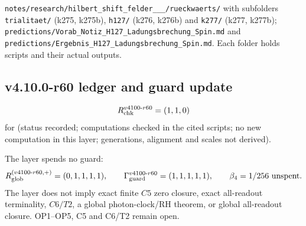 {\raggedright
\texttt{notes/\allowbreak research/\allowbreak hilbert\_\allowbreak shift\_\allowbreak felder\_\_\_/\allowbreak rueckwaerts/} with subfolders
\texttt{trialitaet/} (k275, k275b), \texttt{h127/} (k276, k276b) and \texttt{k277/} (k277, k277b);
\texttt{predictions/\allowbreak Vorab\_\allowbreak Notiz\_\allowbreak H127\_\allowbreak Ladungsbrechung\_\allowbreak Spin.md} and
\texttt{predictions/\allowbreak Ergebnis\_\allowbreak H127\_\allowbreak Ladungsbrechung\_\allowbreak Spin.md}.  Each folder holds scripts and their actual outputs.
\par}

\subsection*{v4.10.0-r60 ledger and guard update}
\label{subsec:v4100-r60-ledger-guard}

\[
R_{\rm chk}^{v4100\text{-}r60}=(1,1,0)
\]
for (status recorded; computations checked in the cited scripts; no new computation in this layer; generations, alignment and scales not derived).

The layer spends no guard:
\[
R_{\rm glob}^{(v4100\text{-}r60,+)}=(0,1,1,1,1),
\qquad
\Gamma_{\rm guard}^{v4100\text{-}r60}=(1,1,1,1,1),
\qquad
\beta_4=1/256\ \text{unspent}.
\]
The layer does not imply exact finite \(C5\) zero closure, exact all-readout terminality, \(C6/T2\), a global photon-clock/RH theorem,
or global all-readout closure.  OP1--OP5, C5 and C6/T2 remain open.
